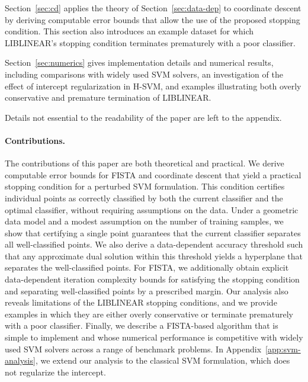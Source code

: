\documentclass[twoside,11pt]{article}
\begin{document}
Section~\ref{sec:cd} applies the theory of Section~\ref{sec:data-dep} to coordinate descent by deriving computable error bounds that allow the use of the proposed stopping condition. This section also introduces an example dataset for which LIBLINEAR's stopping condition terminates prematurely with a poor classifier.

Section~\ref{sec:numerics} gives implementation details and numerical results, including comparisons with widely used SVM solvers, an investigation of the effect of intercept regularization in H-SVM, and examples illustrating both overly conservative and premature termination of LIBLINEAR.

Details not essential to the readability of the paper are left to the appendix.

\paragraph{Contributions.}
The contributions of this paper are both theoretical and practical. We derive computable error bounds for FISTA and coordinate descent that yield a practical stopping condition for a perturbed SVM formulation. This condition certifies individual points as correctly classified by both the current classifier and the optimal classifier, without requiring assumptions on the data. Under a geometric data model and a modest assumption on the number of training samples, we show that certifying a single point guarantees that the current classifier separates all well-classified points. We also derive a data-dependent accuracy threshold such that any approximate dual solution within this threshold yields a hyperplane that separates the well-classified points. For FISTA, we additionally obtain explicit data-dependent iteration complexity bounds for satisfying the stopping condition and separating well-classified points by a prescribed margin. Our analysis also reveals limitations of the LIBLINEAR stopping conditions, and we provide examples in which they are either overly conservative or terminate prematurely with a poor classifier. Finally, we describe a FISTA-based algorithm that is simple to implement and whose numerical performance is competitive with widely used SVM solvers across a range of benchmark problems. In Appendix~\ref{app:svm-analysis}, we extend our analysis to the classical SVM formulation, which does not regularize the intercept.
\end{document}
